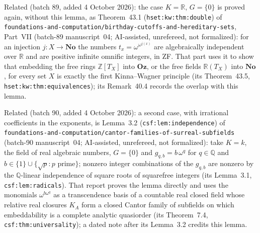 \documentclass[11pt,a4paper]{article}
\numberwithin{equation}{section}
\theoremstyle{definition}
\theoremstyle{remark}
\newcommand{\No}{\mathbf{No}}
\newcommand{\Oz}{\mathbf{Oz}}
\newcommand{\Z}{\mathbb Z}
\newcommand{\Q}{\mathbb Q}
\newcommand{\R}{\mathbb R}
\newcommand{\repopath}[1]{\nolinkurl{#1}}
\newcommand{\lbl}[1]{\nolinkurl{#1}}
\begin{document}
Related (batch 89, added 4 October 2026): the case $K=\R$, $G=\{0\}$ is
proved again, without this lemma, as Theorem~43.1 (\lbl{hset:kw:thm:double})
of \repopath{foundations-and-computation/birthday-cutoffs-and-hereditary-sets},
Part~VII (batch-89 manuscript~04; AI-assisted, unrefereed, not formalized):
for an injection $j:X\to\No$ the numbers $t_x=\omega^{\omega^{j(x)}}$ are
algebraically independent over $\R$ and are positive infinite omnific
integers, in ZF. That part uses it to show that embedding the free rings
$\Z[T_X]$ into $\Oz$, or the free fields $\R(T_X)$ into $\No$, for every set
$X$ is exactly the first Kinna--Wagner principle (its Theorem~43.5,
\lbl{hset:kw:thm:equivalences}); its Remark~40.4 records the overlap with
this lemma.

Related (batch 90, added 4 October 2026): a second case, with irrational
coefficients in the exponents, is Lemma~3.2 (\lbl{csf:lem:independence}) of
\repopath{foundations-and-computation/cantor-families-of-surreal-subfields}
(batch-90 manuscript~04; AI-assisted, unrefereed, not formalized): take $K=k$,
the field of real algebraic numbers, $G=\{0\}$ and $g_{q,b}=b\,\omega^q$ for
$q\in\Q$ and $b\in\{1\}\cup\{\sqrt p:p\text{ prime}\}$; nonzero integer
combinations of the $g_{q,b}$ are nonzero by the $\Q$-linear independence of
square roots of squarefree integers (its Lemma~3.1,
\lbl{csf:lem:radicals}). That report proves the lemma directly and uses the
monomials $\omega^{b\omega^q}$ as a transcendence basis of a countable real
closed field whose relative real closures $K_A$ form a closed Cantor family
of subfields on which embeddability is a complete analytic quasiorder (its
Theorem~7.4, \lbl{csf:thm:universality}); a dated note after its Lemma~3.2
credits this lemma.
\end{document}
